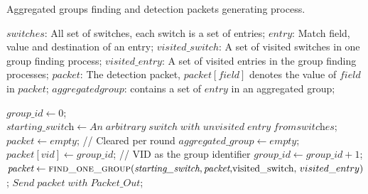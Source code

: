 \documentclass[conference]{IEEEtran}
\begin{document}
\label{pseudo}
\begin{algorithm}[ht]

  \caption{Aggregated groups finding and detection packets generating process.}
  \begin{algorithmic}[1]
    \Require
      $switches$: All set of switches, each switch is a set of entries;  \newline
      $entry$: Match field, value and destination of an entry;  \newline
      $visited\_switch$: A set of visited switches in one group finding process;  \newline
      $visited\_entry$: A set of visited entries in the group finding processes; \newline
      $packet$: The detection packet, $packet[field]$ denotes the value of $field$ in $packet$; \newline
      $aggregated group$: contains a set of $entry$ in an aggregated group; \newline
      
      \State $\textit{group\_id} \gets 0$;
            \State $\textit{starting\_switch} \gets An\;arbitrary\;switch\;with\;unvisited\;entry\;from\textit{switches}$;
            \State $\textit{packet} \gets empty$;   // Cleared per round
            \State $\textit{aggregated\_group} \gets empty$;
            \State $packet[vid] \gets \textit{group\_id}$;   // VID as the group identifier 
            \State $group\_id \gets \textit{group\_id} + 1$;
            \State $\textit{packet} \gets \Call{find\_one\_group}{\textit{starting\_switch}, \textit{packet}, $visited\_switch, $visited\_entry}$;
            \State $Send\;\textit{packet}\;with\;Packet\_Out$;
      \EndWhile
    \EndFunction
  \end{algorithmic}
\end{algorithm}
\end{document}

